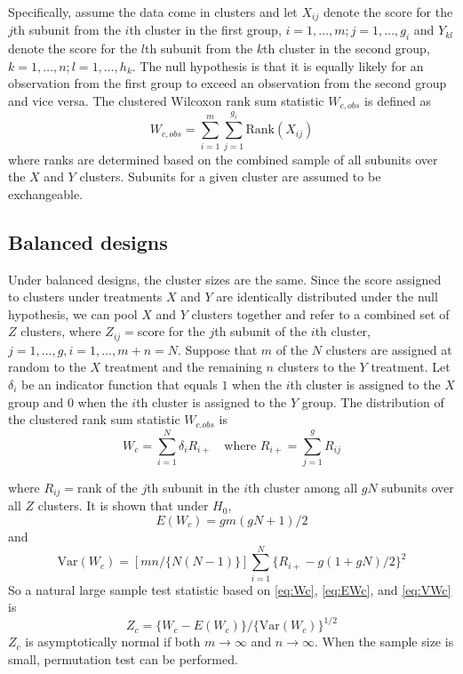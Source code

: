 \documentclass[article]{jss}
\begin{document}
Specifically, 
assume the data come in clusters and 
let $X_{ij}$ denote the score for the $j$th subunit
from the $i$th cluster in the first group, 
$i = 1,\ldots,m; j = 1,\ldots,g_i$ and $Y_{kl}$ 
denote the score for the $l$th subunit from 
the $k$th cluster in the second group,
$k=1, \ldots,n;l=1,\ldots,h_k$.
The null hypothesis is that it is 
equally likely for an observation from the 
first group to exceed an 
observation from the second group and vice versa.
The clustered Wilcoxon rank sum statistic 
$W_{c,obs}$ is defined as 
\begin{equation} \label{eq:Wco}
W_{c,obs} = \sum_{i=1}^m\sum_{j=1}^{g_i}\text{Rank}(X_{ij})
\end{equation}
where ranks are determined based on the
combined sample of all subunits over the
$X$ and $Y$ clusters. Subunits
for a given cluster are assumed to be exchangeable.


\subsection{Balanced designs}\label{bal}
Under balanced designs, the cluster sizes are the same.
Since the score assigned to clusters under treatments
$X$ and $Y$ are
identically distributed under the null hypothesis, we can pool $X$ and $Y$ clusters together and refer to a combined set of $Z$ clusters, where $Z_{ij} = $score for the $j$th subunit of the $i$th cluster, $j = 1,\ldots,g, i=1,\ldots,m+n = N$. Suppose that $m$ of the $N$ clusters are assigned at random to the $X$ treatment and the remaining $n$ clusters to the $Y$ treatment. Let $\delta_i$ be
an indicator function that equals $1$ when the $i$th cluster 
is assigned to the $X$ group and $0$ when the $i$th cluster
is assigned to the $Y$ group. 
The distribution of the clustered rank sum statistic $W_{c.obs}$ is
\begin{equation}\label{eq:Wc}
W_c = \sum^N_{i=1}\delta_iR_{i+} \quad \text{where   }R_{i+} = \sum^g_{j=1}R_{ij}
\end{equation}

where $R_{ij}=$rank of the $j$th subunit in the $i$th cluster among all $gN$ subunits over all $Z$ clusters. It is shown that under $H_0$, 
\begin{equation}\label{eq:EWc}
E(W_c) = gm(gN + 1)/2
\end{equation}
and 
\begin{equation}\label{eq:VWc}
\text{Var}(W_c) = [mn/\{N(N-1)\}]\sum^N_{i=1}\{R_{i+} - g(1+gN)/2\}^2
\end{equation}
So a natural large sample test statistic based on \eqref{eq:Wc}, \eqref{eq:EWc}, and \eqref{eq:VWc} is 
\begin{equation}
Z_c = \{W_c - E(W_c)\}/\{\text{Var}(W_c)\}^{1/2}
\end{equation}
$Z_c$ is asymptotically normal if both $m \to \infty$ and $n \to \infty$. When the sample size is small, permutation test can be 
performed.
\end{document}
